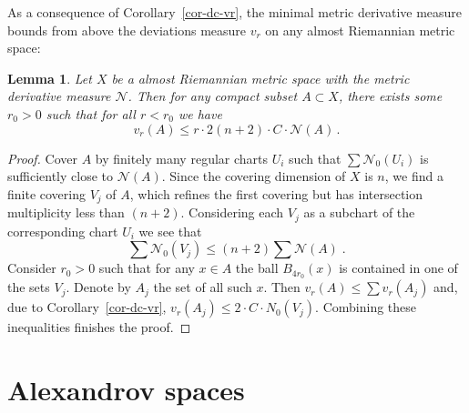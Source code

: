\documentclass[12pt,leqno]{amsart}
\numberwithin{equation}{section}
\newtheorem{lem}[thm]{Lemma}
\theoremstyle{definition}
\theoremstyle{remark}
\newcommand{\cref}[1]{Corollary~\ref{#1}}
\begin{document}
As a consequence of \cref{cor-dc-vr}, the minimal metric derivative measure bounds from above the deviations measure $v_r$
on any almost Riemannian metric space:





\begin{lem} \label{cor-mu-dc}
Let $X$ be a almost Riemannian metric space with the metric derivative measure $\mathcal N$.
Then for any compact subset $A\subset X$, there exists some $r_0>0$ such that for all
$r<r_0$ we have $$v_r (A) \leq r\cdot 2  (n+2)\cdot C\cdot \mathcal N (A)\,. $$
\end{lem}


\begin{proof}
Cover $A$ by finitely many regular charts $U_i$ such that $\sum \mathcal N_0 (U_i)$ is sufficiently close to $\mathcal N (A)$.
Since the covering dimension of $X$ is $n$, we find   a finite covering $V_j$ of $A$, which refines  the first covering but has intersection multiplicity less than $(n+2)$.  Considering each $V_j$ as a subchart of the corresponding chart $U_i$ we see that
 $$\sum \mathcal N_0 (V_j) \leq (n+2) \sum \mathcal N(A) \; .$$
Consider $r_0>0$ such that for any $x\in A$ the ball $B_{4r_0} (x)$ is contained in one of the sets $V_j$.   Denote by $A_j$ the set of all such $x$.
 Then  $v_r (A) \leq \sum v_r (A_j)$ and, due to \cref{cor-dc-vr},  $v_r (A_j) \leq  2 \cdot C\cdot N_0 (V_j)$.
   Combining these  inequalities finishes the proof.
\end{proof}















\section{Alexandrov spaces} \label{sec:Alex}
\end{document}
